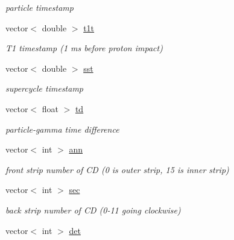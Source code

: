 \begin{DoxyCompactItemize}
\begin{DoxyCompactList}\small\item\em particle timestamp \end{DoxyCompactList}\item 
\hypertarget{classmbevts_af6b3a53709fd892151e864033e7aabf6}{vector$<$ double $>$ \hyperlink{classmbevts_af6b3a53709fd892151e864033e7aabf6}{t1t}}\label{classmbevts_af6b3a53709fd892151e864033e7aabf6}

\begin{DoxyCompactList}\small\item\em T1 timestamp (1 ms before proton impact) \end{DoxyCompactList}\item 
\hypertarget{classmbevts_a6c752c13012ca9fa78cd889d2d2f4a3d}{vector$<$ double $>$ \hyperlink{classmbevts_a6c752c13012ca9fa78cd889d2d2f4a3d}{sst}}\label{classmbevts_a6c752c13012ca9fa78cd889d2d2f4a3d}

\begin{DoxyCompactList}\small\item\em supercycle timestamp \end{DoxyCompactList}\item 
\hypertarget{classmbevts_a577bfcdc97c54ad53a452200dff118e2}{vector$<$ float $>$ \hyperlink{classmbevts_a577bfcdc97c54ad53a452200dff118e2}{td}}\label{classmbevts_a577bfcdc97c54ad53a452200dff118e2}

\begin{DoxyCompactList}\small\item\em particle-\/gamma time difference \end{DoxyCompactList}\item 
\hypertarget{classmbevts_a76cdc10ec6f7b2f249d7dbd52571825c}{vector$<$ int $>$ \hyperlink{classmbevts_a76cdc10ec6f7b2f249d7dbd52571825c}{ann}}\label{classmbevts_a76cdc10ec6f7b2f249d7dbd52571825c}

\begin{DoxyCompactList}\small\item\em front strip number of C\-D (0 is outer strip, 15 is inner strip) \end{DoxyCompactList}\item 
\hypertarget{classmbevts_a4f155f19153b57357f4596fdca3bf13b}{vector$<$ int $>$ \hyperlink{classmbevts_a4f155f19153b57357f4596fdca3bf13b}{sec}}\label{classmbevts_a4f155f19153b57357f4596fdca3bf13b}

\begin{DoxyCompactList}\small\item\em back strip number of C\-D (0-\/11 going clockwise) \end{DoxyCompactList}\item 
\hypertarget{classmbevts_aa61c98b5a4c645e818f6b8767a7b3b54}{vector$<$ int $>$ \hyperlink{classmbevts_aa61c98b5a4c645e818f6b8767a7b3b54}{det}}\label{classmbevts_aa61c98b5a4c645e818f6b8767a7b3b54}


\end{DoxyCompactItemize}
